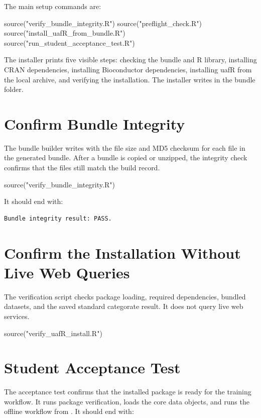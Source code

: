 The main setup commands are:

\begin{rcode}
source("verify_bundle_integrity.R")
source("preflight_check.R")
source("install_uafR_from_bundle.R")
source("run_student_acceptance_test.R")
\end{rcode}

The installer prints five visible steps: checking the bundle and R library, installing CRAN dependencies, installing Bioconductor dependencies, installing uafR from the local archive, and verifying the installation. The installer writes  in the bundle folder.

\section{Confirm Bundle Integrity}
The bundle builder writes  with the file size and MD5 checksum for each file in the generated bundle. After a bundle is copied or unzipped, the integrity check confirms that the files still match the build record.

\begin{rcode}
source("verify_bundle_integrity.R")
\end{rcode}

It should end with:

\begin{verbatim}
Bundle integrity result: PASS.
\end{verbatim}

\section{Confirm the Installation Without Live Web Queries}
The verification script checks package loading, required dependencies, bundled datasets, and the saved standard categorate result. It does not query live web services.

\begin{rcode}
source("verify_uafR_install.R")
\end{rcode}

\section{Student Acceptance Test}
The acceptance test confirms that the installed package is ready for the training workflow. It runs package verification, loads the core data objects, and runs the offline workflow from . It should end with:

